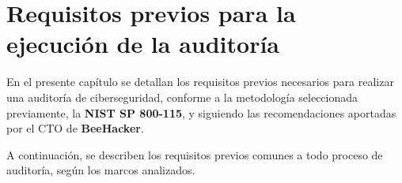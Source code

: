 \documentclass[a4paper, 11pt]{article}
\begin{document}
\clearpage

\thispagestyle{nohead}





\section{Requisitos previos para la ejecución de la auditoría}

En el presente capítulo se detallan los requisitos previos necesarios para realizar una auditoría de ciberseguridad, conforme a la metodología seleccionada previamente, la \textbf{NIST SP 800-115}, y siguiendo las recomendaciones aportadas por el CTO de \textbf{BeeHacker}. 

A continuación, se describen los requisitos previos comunes a todo proceso de auditoría, según los marcos analizados.
\end{document}
